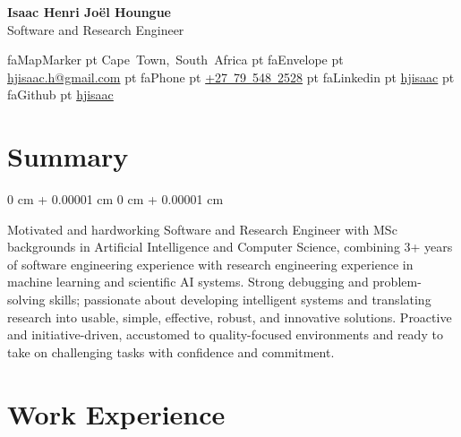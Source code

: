 \documentclass[10pt, letterpaper]{article}
\newenvironment{onecolentry}{
    \begin{adjustwidth}{
        0 cm + 0.00001 cm
    }{
        0 cm + 0.00001 cm
    }
}{
    \end{adjustwidth}
} %
\newenvironment{header}{
    \setlength{\topsep}{0pt}\par\kern\topsep\centering\linespread{1.5}
}{
    \par\kern\topsep
} %
\begin{document}
    

    
    \begin{header}
        \fontsize{22 pt}{22 pt}\selectfont  \flushleft \textbf{Isaac Henri Joël Houngue } \\
        Software and Research Engineer

        \vspace{6 pt}
        \normalsize

        \csname faMapMarker\endcsname {} pt \mbox{Cape Town, South Africa}  pt \csname faEnvelope\endcsname {} pt \mbox{\href{mailto:hjisaac.h@gmail.com}{hjisaac.h@gmail.com}}  pt \csname faPhone\endcsname {} pt \mbox{\href{tel:+27795482528}{+27 79 548 2528}}  pt \csname faLinkedin\endcsname {} pt \mbox{\href{https://linkedin.com/in/hjisaac}{hjisaac}}  pt \csname faGithub\endcsname {} pt \mbox{\href{https://github.com/hjisaac}{hjisaac}}
    \end{header}
    

    \vspace{6 pt - 0.3 cm}

    



    \section{Summary}

    
        \begin{onecolentry}
            Motivated and hardworking Software and Research Engineer with MSc backgrounds in Artificial Intelligence and Computer Science, combining 3+ years of software engineering experience with research engineering experience in machine learning and scientific AI systems. Strong debugging and problem-solving skills; passionate about developing intelligent systems and translating research into usable, simple, effective, robust, and innovative solutions. Proactive and initiative-driven, accustomed to quality-focused environments and ready to take on challenging tasks with confidence and commitment.

        \end{onecolentry}

    


    \section{Work Experience}
\end{document}
